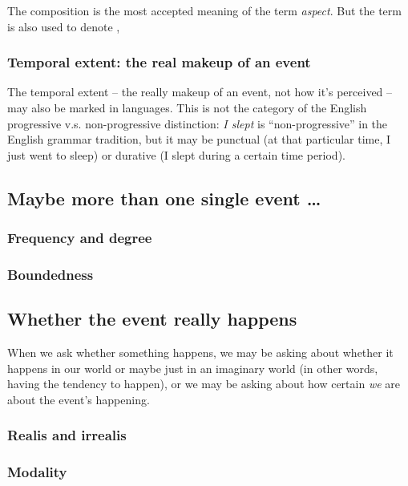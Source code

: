 \documentclass[UTF8, a4paper, oneside, scheme=plain]{ctexart}
\newcommand*{\term}[1]{\emph{#1}}
\newcommand*{\corpus}[1]{\emph{#1}}
\begin{document}
The composition is the most accepted meaning of the term \term{aspect}.
But the term is also used to denote 
, 

\subsubsection{Temporal extent: the real makeup of an event}

The temporal extent -- the really makeup of an event, not how it's perceived -- 
may also be marked in languages.
This is not the category of the English progressive v.s. non-progressive distinction:
\corpus{I slept} is ``non-progressive'' in the English grammar tradition,
but it may be punctual (at that particular time, I just went to sleep) 
or durative (I slept during a certain time period).

\subsection{Maybe more than one single event \dots}

\subsubsection{Frequency and degree}

\subsubsection{Boundedness}

\subsection{Whether the event really happens}

When we ask whether something happens,
we may be asking about whether it happens in our world 
or maybe just in an imaginary world (in other words, having the tendency to happen),
or we may be asking about how certain \emph{we} are about the event's happening.

\subsubsection{Realis and irrealis}\label{sec:irrealis}

\subsubsection{Modality}
\end{document}
